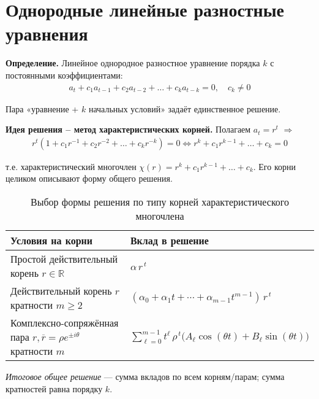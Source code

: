\section{Однородные линейные разностные уравнения}\label{sec:homogeneous}

\begin{center}
\end{center}

\textbf{Определение.} Линейное однородное разностное уравнение порядка $k$ с постоянными коэффициентами:
\begin{align}
a_t + c_1 a_{t-1} + c_2 a_{t-2} + \dots + c_k a_{t-k} = 0, \quad c_k \neq 0
\end{align}

Пара «уравнение + $k$ начальных условий» задаёт единственное решение.

\textbf{Идея решения -- метод характеристических корней.} Полагаем $a_t = r^t$ $\Rightarrow$
\begin{align}
r^t (1 + c_1 r^{-1} + c_2 r^{-2} + \dots + c_k r^{-k}) = 0 \iff r^k + c_1 r^{k-1} + \dots + c_k = 0
\end{align}

т.е. характеристический многочлен $\chi(r) = r^k + c_1 r^{k-1} + \dots + c_k$. Его корни целиком описывают форму общего решения.

\begin{table}[h!]
\centering
\caption{Выбор формы решения по типу корней характеристического многочлена}
\label{tab:form-choices}
\begin{tabular}{|l|l|}
\hline
\textbf{Условия на корни} & \textbf{Вклад в решение} \\
\hline
Простой действительный корень $r\in\mathbb{R}$ &
$\alpha\, r^{\,t}$ \\
\hline
Действительный корень $r$ кратности $m\ge 2$ &
$(\alpha_{0}+\alpha_{1}t+\cdots+\alpha_{m-1}t^{m-1})\, r^{\,t}$ \\
\hline
Комплексно-сопряжённая пара $r,\overline{r}=\rho e^{\pm i\theta}$ кратности $m$ &
$\displaystyle \sum_{\ell=0}^{m-1} t^{\ell}\,\rho^{\,t}\big(A_{\ell}\cos(\theta t)+B_{\ell}\sin(\theta t)\big)$ \\
\hline
\end{tabular}

\vspace{0.5em}
\emph{Итоговое общее решение} — сумма вкладов по всем корням/парам; сумма кратностей равна порядку $k$.
\end{table}

